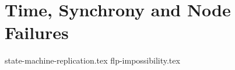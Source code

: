 \chapter{Time, Synchrony and Node Failures}

{state-machine-replication.tex}
{flp-impossibility.tex}
